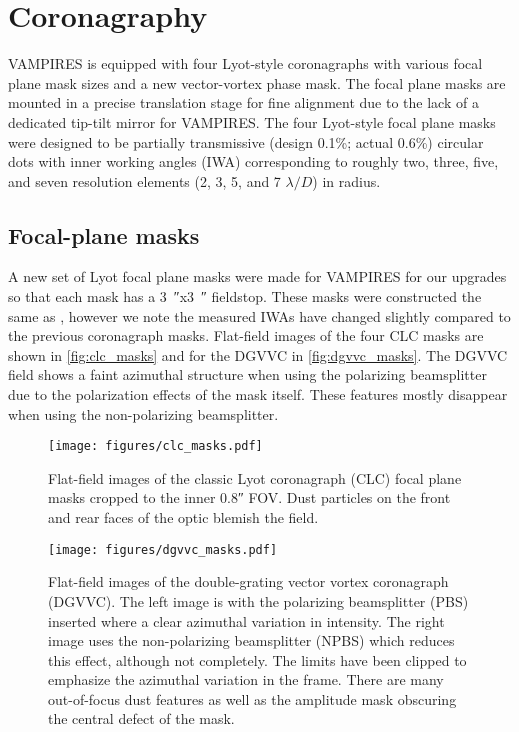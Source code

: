\section{Coronagraphy}\label{sec:coronagraphy}

VAMPIRES is equipped with four Lyot-style coronagraphs with various focal plane mask sizes and a new vector-vortex phase mask. The focal plane masks are mounted in a precise translation stage for fine alignment due to the lack of a dedicated tip-tilt mirror for VAMPIRES. The four Lyot-style focal plane masks were designed to be partially transmissive (design 0.1\%; actual 0.6\%) circular dots with inner working angles (IWA) corresponding to roughly two, three, five, and seven resolution elements (2, 3, 5, and 7 $\lambda/D$) in radius.

\subsection{Focal-plane masks}

A new set of Lyot focal plane masks were made for VAMPIRES for our upgrades so that each mask has a \SI{3}{\arcsecond}x\SI{3}{\arcsecond} fieldstop. These masks were constructed the same as \citet{lucas_visible-light_2022}, however we note the measured IWAs have changed slightly compared to the previous coronagraph masks. Flat-field images of the four CLC masks are shown in \autoref{fig:clc_masks} and for the DGVVC in \autoref{fig:dgvvc_masks}. The DGVVC field shows a faint azimuthal structure when using the polarizing beamsplitter due to the polarization effects of the mask itself. These features mostly disappear when using the non-polarizing beamsplitter.

\begin{figure}
    \centering
    \texttt{[image: figures/clc\_masks.pdf]}
    \caption{Flat-field images of the classic Lyot coronagraph (CLC) focal plane masks cropped to the inner \ang{;;0.8} FOV. Dust particles on the front and rear faces of the optic blemish the field.\label{fig:clc_masks}}
\end{figure}

\begin{figure}
    \centering
    \texttt{[image: figures/dgvvc\_masks.pdf]}
    \caption{Flat-field images of the double-grating vector vortex coronagraph (DGVVC). The left image is with the polarizing beamsplitter (PBS) inserted where a clear azimuthal variation in intensity. The right image uses the non-polarizing beamsplitter (NPBS) which reduces this effect, although not completely. The limits have been clipped to emphasize the azimuthal variation in the frame. There are many out-of-focus dust features as well as the amplitude mask obscuring the central defect of the mask.\label{fig:dgvvc_masks}}
\end{figure}

